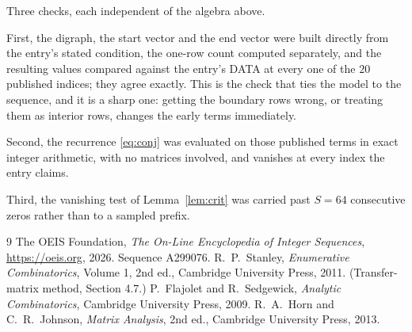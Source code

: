 \documentclass[11pt,a4paper]{article}
\theoremstyle{plain}
\theoremstyle{definition}
\begin{document}
Three checks, each independent of the algebra above.

First, the digraph, the start vector and the end vector were built directly from the
entry's stated condition, the one-row count computed separately, and the resulting values
compared against the entry's DATA at every one of the $20$ published indices; they
agree exactly. This is the check that ties the model to the sequence, and it is a sharp one:
getting the boundary rows wrong, or treating them as interior rows, changes the early terms
immediately.

Second, the recurrence \eqref{eq:conj} was evaluated on those published terms in exact
integer arithmetic, with no matrices involved, and vanishes at every index the entry claims.

Third, the vanishing test of Lemma~\ref{lem:crit} was carried past $S=64$ consecutive
zeros rather than to a sampled prefix.

\begin{thebibliography}{9}
 The OEIS Foundation, \emph{The On-Line Encyclopedia of Integer
Sequences}, \url{https://oeis.org}, 2026. Sequence A299076.
 R.~P.~Stanley, \emph{Enumerative Combinatorics}, Volume 1, 2nd ed.,
Cambridge University Press, 2011. (Transfer-matrix method, Section 4.7.)
 P.~Flajolet and R.~Sedgewick, \emph{Analytic Combinatorics}, Cambridge
University Press, 2009.
 R.~A.~Horn and C.~R.~Johnson, \emph{Matrix Analysis}, 2nd ed., Cambridge
University Press, 2013.
\end{thebibliography}
\end{document}
